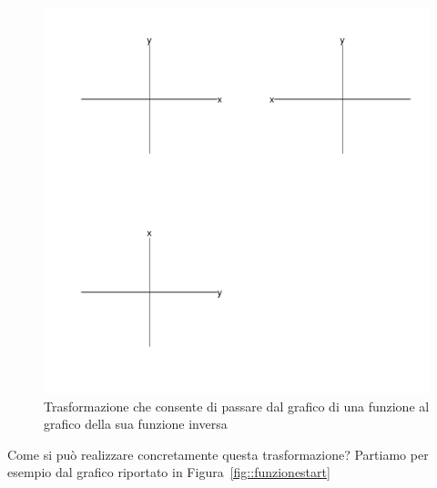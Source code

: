 \documentclass[onecolumn,11pt]{book}\usepackage[]{graphicx}\usepackage[]{color}
\makeatletter
\def\maxwidth{ %
  \ifdim\Gin@nat@width>\linewidth
    \linewidth
  \else
    \Gin@nat@width
  \fi
}
\newenvironment{knitrout}{}{} %
\makeatother
\begin{document}
\begin{figure}
\begin{knitrout}
\color{fgcolor}
\includegraphics[width=\maxwidth]{figure/unnamed-chunk-95-1} 

\end{knitrout}

\caption{Trasformazione che consente di passare dal grafico di una funzione al grafico della sua funzione inversa}
\label{fig::simmetria}
  \end{figure}
Come si pu\`o realizzare concretamente questa trasformazione?
Partiamo per esempio dal grafico riportato in Figura~\ref{fig::funzionestart}
\end{document}
